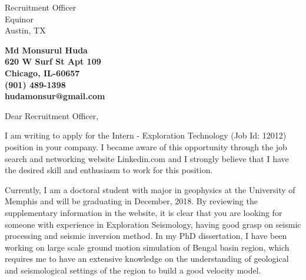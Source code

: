 \documentclass[11pt]{letter} %
\begin{document}

\begin{letter}{Recruitment Officer \\
Equinor \\
Austin, TX \\ 
} 


\begin{center}
\large\bf Md Monsurul Huda \\ %
620 W Surf St Apt 109 \\ Chicago, IL-60657 \\ (901) 489-1398 \\ hudamonsur@gmail.com %
\end{center} 
\vfill

\signature{Md Monsurul Huda} %


\opening{Dear Recruitment Officer,} 


I am writing to apply for the Intern - Exploration Technology (Job Id: 12012) position in your company. I became aware of this opportunity through the job search and networking website Linkedin.com and I strongly believe that I have the desired skill and enthusiasm to work for this position.

Currently, I am a doctoral student with major in geophysics at the University of Memphis and will be graduating in December, 2018. By reviewing the supplementary information in the website, it is clear that you are looking for someone with experience in Exploration Seismology, having good grasp on seismic processing and seismic inversion method. In my PhD dissertation, I have been working on large scale ground motion simulation of Bengal basin region, which requires me to have an extensive knowledge on the understanding of geological and seismological settings of the region to build a good velocity model.


\end{letter}
\end{document}

